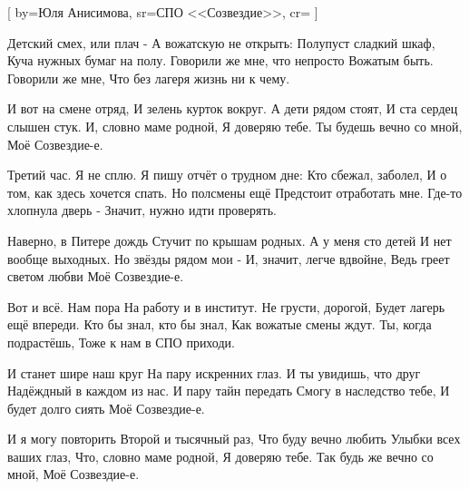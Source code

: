 [
  by={Юля Анисимова},
  sr={СПО <<Созвездие>>},
  cr={}
  ]


\ifdefined\EXPLAINED
	
\else 

\fi



\beginverse
Детский смех, или плач - 
А вожатскую не открыть:
Полупуст сладкий шкаф,
Куча нужных бумаг на полу.
Говорили же мне, что непросто 
Вожатым быть.
Говорили же мне, 
Что без лагеря жизнь ни к чему.
\endverse


\beginchorus
И вот на смене отряд,
И зелень курток вокруг.
А дети рядом стоят,
И ста сердец слышен стук.
И, словно маме родной,
Я доверяю тебе.
Ты будешь вечно со мной,
Моё Созвездие-е.
\endchorus


\beginverse
Третий час. Я не сплю.
Я пишу отчёт о трудном дне:
Кто сбежал, заболел,
И о том, как здесь хочется спать.
Но полсмены ещё
Предстоит отработать мне.
Где-то хлопнула дверь - 
Значит, нужно идти проверять.
\endverse


\beginchorus
Наверно, в Питере дождь
Стучит по крышам родных.
А у меня сто детей
И нет вообще выходных.
Но звёзды рядом мои -
И, значит, легче вдвойне,
Ведь греет светом любви
Моё Созвездие-е.
\endchorus

\beginverse
Вот и всё. Нам пора
На работу и в институт.
Не грусти, дорогой,
Будет лагерь ещё впереди.
Кто бы знал, кто бы знал,
Как вожатые смены ждут.
Ты, когда подрастёшь,
Тоже к нам в СПО приходи.
\endverse


\beginchorus
И станет шире наш круг
На пару искренних глаз.
И ты увидишь, что друг
Надёждный в каждом из нас.
И пару тайн передать
Смогу в наследство тебе,
И будет долго сиять
Моё Созвездие-е.
\bigskip

И я могу повторить
Второй и тысячный раз,
Что буду вечно любить
Улыбки всех ваших глаз,
Что, словно маме родной,
Я доверяю тебе.
Так будь же вечно со мной,
Моё Созвездие-е.
\endchorus

\endsong

